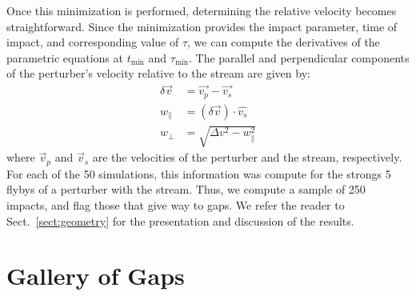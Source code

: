 \documentclass[draft]{aa}
\begin{document}
\begin{appendix}
      Once this minimization is performed, determining the relative velocity becomes straightforward. Since the minimization provides the impact parameter, time of impact, and corresponding value of $\tau$, we can compute the derivatives of the parametric equations at $t_{\text{min}}$ and $\tau_{\text{min}}$. The parallel and perpendicular components of the perturber's velocity relative to the stream are given by:
      \begin{equation}
        \begin{aligned}
          \delta \vec{v} &=\vec{v_p} - \vec{v_s} \\
          w_\parallel &= \left(\delta \vec{v}\right)\cdot \hat{v_s}\\  
          w_\perp &=  \sqrt{\Delta v ^2 - w_\parallel ^ 2}
          \end{aligned}
        \end{equation}
      where $\vec{v}_p$ and $\vec{v}_s$ are the velocities of the perturber and the stream, respectively. For each of the 50 simulations, this information was compute for the strongs 5 flybys of a perturber with the stream. Thus, we compute a sample of 250 impacts, and flag those that give way to gaps. We refer the reader to Sect.~\ref{sect:geometry} for the presentation and discussion of the results.




  \section{Gallery of Gaps} \label{sec:gallery_of_gaps}


\end{appendix}
\end{document}
